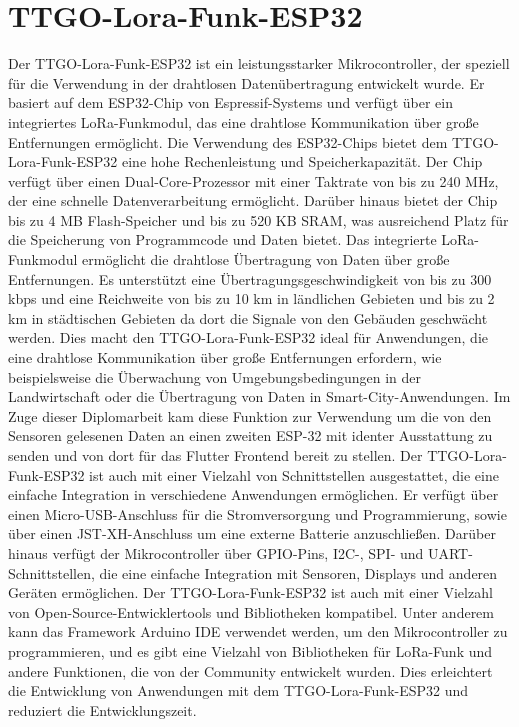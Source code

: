 \section{TTGO-Lora-Funk-ESP32 }
Der TTGO-Lora-Funk-ESP32 ist ein leistungsstarker Mikrocontroller, der speziell für die Verwendung in der drahtlosen Datenübertragung entwickelt wurde. 
Er basiert auf dem ESP32-Chip von Espressif-Systems und verfügt über ein integriertes LoRa-Funkmodul, das eine drahtlose Kommunikation über große Entfernungen ermöglicht.
Die Verwendung des ESP32-Chips bietet dem TTGO-Lora-Funk-ESP32 eine hohe Rechenleistung und Speicherkapazität. 
Der Chip verfügt über einen Dual-Core-Prozessor mit einer Taktrate von bis zu 240 MHz, der eine schnelle Datenverarbeitung ermöglicht. 
Darüber hinaus bietet der Chip bis zu 4 MB Flash-Speicher und bis zu 520 KB SRAM, was ausreichend Platz für die Speicherung von Programmcode und Daten bietet.
Das integrierte LoRa-Funkmodul ermöglicht die drahtlose Übertragung von Daten über große Entfernungen. Es unterstützt eine Übertragungsgeschwindigkeit von bis zu 300 kbps und eine Reichweite von bis zu 10 km in ländlichen Gebieten und bis zu 2 km in städtischen Gebieten da dort die Signale von den Gebäuden geschwächt werden. Dies macht den TTGO-Lora-Funk-ESP32 ideal für Anwendungen, die eine drahtlose Kommunikation über große Entfernungen erfordern, wie beispielsweise die Überwachung von Umgebungsbedingungen in der Landwirtschaft oder die Übertragung von Daten in Smart-City-Anwendungen. Im Zuge dieser Diplomarbeit kam diese Funktion zur Verwendung um die von den Sensoren gelesenen Daten an einen zweiten ESP-32 mit identer Ausstattung zu senden und von dort für das Flutter Frontend bereit zu stellen. 
Der TTGO-Lora-Funk-ESP32 ist auch mit einer Vielzahl von Schnittstellen ausgestattet, die eine einfache Integration in verschiedene Anwendungen ermöglichen. Er verfügt über einen Micro-USB-Anschluss für die Stromversorgung und Programmierung, sowie über einen JST-XH-Anschluss um eine externe Batterie anzuschließen. Darüber hinaus verfügt der Mikrocontroller über GPIO-Pins, I2C-, SPI- und UART-Schnittstellen, die eine einfache Integration mit Sensoren, Displays und anderen Geräten ermöglichen.
Der TTGO-Lora-Funk-ESP32 ist auch mit einer Vielzahl von Open-Source-Entwicklertools und Bibliotheken kompatibel.  Unter anderem kann das Framework Arduino IDE verwendet werden, um den Mikrocontroller zu programmieren, und es gibt eine Vielzahl von Bibliotheken für LoRa-Funk und andere Funktionen, die von der Community entwickelt wurden. Dies erleichtert die Entwicklung von Anwendungen mit dem TTGO-Lora-Funk-ESP32 und reduziert die Entwicklungszeit.
